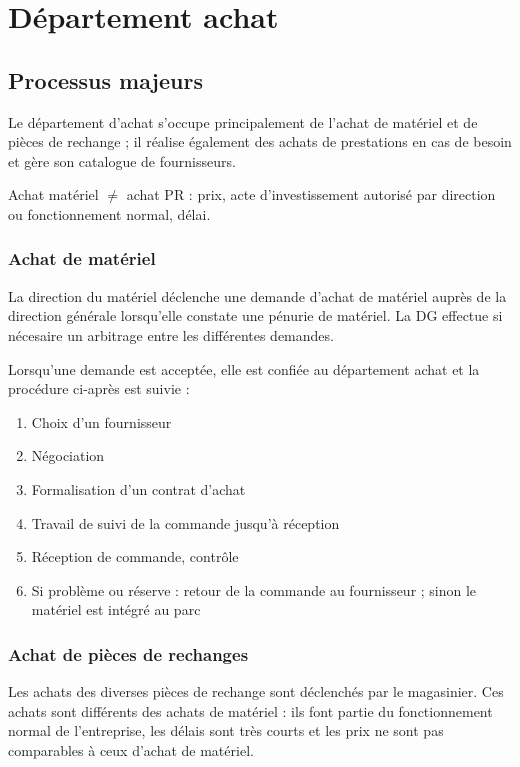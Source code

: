 \section{Département achat}

\subsection{Processus majeurs}

Le département d'achat s'occupe principalement de l'achat de matériel et de
pièces de rechange ; il réalise également des achats de prestations en cas
de besoin et gère son catalogue de fournisseurs.

Achat matériel $\neq$ achat PR : prix, acte d'investissement autorisé
par direction ou fonctionnement normal, délai.


\subsubsection{Achat de matériel}

La direction du matériel déclenche une demande d'achat de matériel auprès
de la direction générale lorsqu'elle constate une pénurie de matériel. La
DG effectue si nécesaire un arbitrage entre les différentes demandes.

Lorsqu'une demande est acceptée, elle est confiée au département achat et
la procédure ci-après est suivie :

\begin{enumerate}
\item Choix d'un fournisseur
\item Négociation
\item Formalisation d'un contrat d'achat
\item Travail de suivi de la commande jusqu'à réception
\item Réception de commande, contrôle
\item Si problème ou réserve : retour de la commande au fournisseur ; sinon
        le matériel est intégré au parc
\end{enumerate}


\subsubsection{Achat de pièces de rechanges}

Les achats des diverses pièces de rechange sont déclenchés
par le magasinier.
Ces achats sont différents des achats de matériel : ils font partie du
fonctionnement normal de l'entreprise, les délais sont très courts et les
prix ne sont pas comparables à ceux d'achat de matériel.

